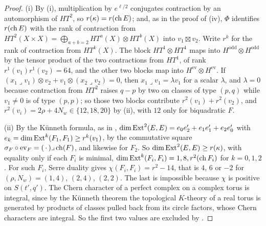 \begin{proof}
(i) By (i), multiplication by $e^{\ell/2}$ conjugates
contraction by an automorphism of $HT^{2}$, so $r(\kappa)=r(\operatorname{ch} E)$; and, as
in the proof of (iv), $\Phi$ identifies $r(\operatorname{ch} E)$ with the
rank of contraction from $HT^{2}(X\times X)=\bigoplus_{a+b=2}HT^{a}(X)\otimes
HT^{b}(X)$ into $v_{1}\boxtimes v_{2}$. Write $r^{k}$ for the rank of
contraction from $HT^{k}(X)$. The block $HT^{1}\otimes HT^{1}$ maps into
$H^{\mathrm{odd}}\otimes H^{\mathrm{odd}}$ by the tensor product of the two
contractions from $HT^{1}$, of rank $r^{1}(v_{1})r^{1}(v_{2})=64$, and the other
two blocks map into $H^{\mathrm{ev}}\otimes H^{\mathrm{ev}}$. If
$(x_{1}\lrcorner v_{1})\otimes v_{2}+v_{1}\otimes(x_{2}\lrcorner v_{2})=0$, then
$x_{1}\lrcorner v_{1}=\lambda v_{1}$ for a scalar $\lambda$, and $\lambda=0$
because contraction from $HT^{2}$ raises $q-p$ by two on classes of type
$(p,q)$ while $v_{1}\ne0$ is of type $(p,p)$; so those two blocks contribute
$r^{2}(v_{1})+r^{2}(v_{2})$, and $r^{2}(v_{i})=2\rho+4N_{w}\in\{12,18,20\}$ by
(ii), with $12$ only for biquadratic $F$.

(ii) By the K\"unneth formula, as in ,
$\dim\operatorname{Ext}^{2}(E,E)=e_{0}e_{2}'+e_{1}e_{1}'+e_{2}e_{0}'$ with
$e_{k}=\dim\operatorname{Ext}^{k}(F_{1},F_{1})\ge r^{k}(v_{1})$, by the commutative square
$\sigma_{F}\circ\operatorname{ev}_{F}=(\,\cdot\,)\lrcorner\operatorname{ch}(F)$, and likewise
for $F_{2}$. So $\dim\operatorname{Ext}^{2}(E,E)\ge r(\kappa)$, with equality only if each
$F_{i}$ is minimal, $\dim\operatorname{Ext}^{k}(F_{i},F_{i})=1,8,r^{2}(\operatorname{ch} F_{i})$ for
$k=0,1,2$. For such $F_{i}$, Serre duality gives $\chi(F_{i},F_{i})=r^{2}-14$,
that is $4$, $6$ or $-2$ for $(\rho,N_{w})=(1,4)$, $(2,4)$, $(2,2)$. The last
is impossible because $\chi$ is positive on $S(t',q')$. The Chern character
of a perfect complex on a complex torus is integral, since by the K\"unneth
theorem the topological $K$-theory of a real torus is generated by products of
classes pulled back from its circle factors, whose Chern characters are
integral. So the first two values are excluded by .


\end{proof}
